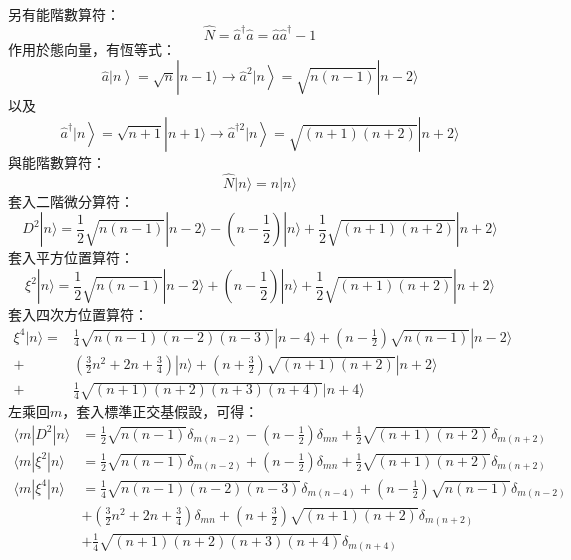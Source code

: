 \documentclass[12pt]{article}
\begin{document}
另有能階數算符：
\begin{equation}
    \hat{N}=\hat{a}^\dagger\hat{a}=\hat{a}\hat{a}^\dagger-1
\end{equation}
作用於態向量，有恆等式： 
\begin{equation}
    \left.\hat{a}|n\right\rangle=\sqrt{n}|n-1\rangle\to\left.\hat{a}^2|n\right\rangle=\sqrt{n(n-1)}|n-2\rangle
\end{equation}
以及
\begin{equation}
    \left.\hat{a}^\dagger|n\right\rangle=\sqrt{n+1}|n+1\rangle\to\left.\hat{a}^{\dagger2}|n\right\rangle=\sqrt{(n+1)(n+2)}|n+2\rangle
\end{equation}
與能階數算符：
\begin{equation}
    \hat{N}|n\rangle=n|n\rangle
\end{equation}
套入二階微分算符：
\begin{equation}
    D^2|n\rangle=\frac12\sqrt{n(n-1)}|n-2\rangle-\left(n-\frac12\right)|n\rangle+\frac12\sqrt{(n+1)(n+2)}|n+2\rangle
\end{equation}
套入平方位置算符：
\begin{equation}
    \xi^2|n\rangle=\frac12\sqrt{n(n-1)}|n-2\rangle+\left(n-\frac12\right)|n\rangle+\frac12\sqrt{(n+1)(n+2)}|n+2\rangle
\end{equation}
套入四次方位置算符：
\begin{align}
    \xi^4|n\rangle=&\frac14\sqrt{n(n-1)(n-2)(n-3)}|n-4\rangle+\left(n-\frac12\right)\sqrt{n(n-1)}|n-2\rangle\nonumber\\
    +&\left(\frac32n^2+2n+\frac34\right)|n\rangle+\left(n+\frac32\right)\sqrt{(n+1)(n+2)}|n+2\rangle\nonumber\\
    +&\frac14\sqrt{(n+1)(n+2)(n+3)(n+4)}|n+4\rangle
\end{align}
左乘回$m$，套入標準正交基假設，可得：
\begin{align}
    \langle m|D^2|n\rangle&=\frac12\sqrt{n(n-1)}\delta_{m(n-2)}-\left(n-\frac12\right)\delta_{mn}+\frac12\sqrt{(n+1)(n+2)}\delta_{m(n+2)}\\
    \langle m|\xi^2|n\rangle&=\frac12\sqrt{n(n-1)}\delta_{m(n-2)}+\left(n-\frac12\right)\delta_{mn}+\frac12\sqrt{(n+1)(n+2)}\delta_{m(n+2)} \\
    \langle m|\xi^4|n\rangle&=\frac14\sqrt{n(n-1)(n-2)(n-3)}\delta_{m(n-4)}+\left(n-\frac12\right)\sqrt{n(n-1)}\delta_{m(n-2)}\nonumber\\
    &+\left(\frac32n^2+2n+\frac34\right)\delta_{mn}+\left(n+\frac32\right)\sqrt{(n+1)(n+2)}\delta_{m(n+2)}\nonumber\\
    &+\frac14\sqrt{(n+1)(n+2)(n+3)(n+4)}\delta_{m(n+4)}
\end{align}
\end{document}
